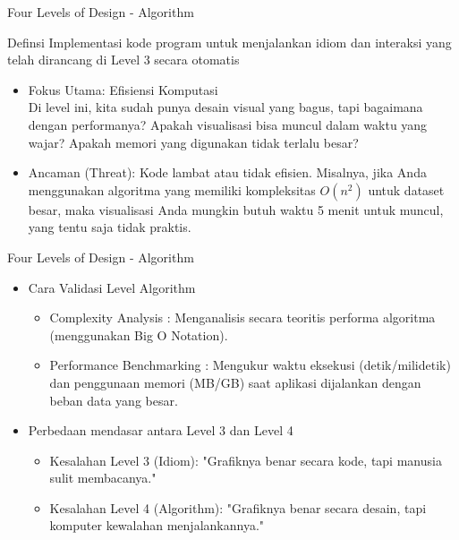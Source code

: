 \documentclass[t]{beamer}
\begin{document}
\begin{frame}{Four Levels of Design - Algorithm}
	\begin{block}{Definsi}
		Implementasi kode program untuk menjalankan idiom dan interaksi yang telah dirancang di Level 3 secara otomatis
	\end{block}
	\begin{itemize}
		\item Fokus Utama: Efisiensi Komputasi \\
		Di level ini, kita sudah punya desain visual yang bagus, tapi bagaimana dengan performanya? Apakah visualisasi bisa muncul dalam waktu yang wajar? Apakah memori yang digunakan tidak terlalu besar?

		\item Ancaman (Threat): Kode lambat atau tidak efisien. Misalnya, jika Anda menggunakan algoritma yang memiliki kompleksitas $O(n^2)$ untuk dataset besar, maka visualisasi Anda mungkin butuh waktu 5 menit untuk muncul, yang tentu saja tidak praktis.
	\end{itemize}
\end{frame}


\begin{frame}{Four Levels of Design - Algorithm}
	\begin{itemize}
		\item Cara Validasi Level Algorithm
		\begin{itemize}
			\item Complexity Analysis : Menganalisis secara teoritis performa algoritma (menggunakan Big O Notation).
			\item Performance Benchmarking : Mengukur waktu eksekusi (detik/milidetik) dan penggunaan memori (MB/GB) saat aplikasi dijalankan dengan beban data yang besar.
		\end{itemize}
		\item Perbedaan mendasar antara Level 3 dan Level 4
		\begin{itemize}
			\item Kesalahan Level 3 (Idiom): "Grafiknya benar secara kode, tapi manusia sulit membacanya."
			\item Kesalahan Level 4 (Algorithm): "Grafiknya benar secara desain, tapi komputer kewalahan menjalankannya."
		\end{itemize}
	\end{itemize}
\end{frame}
\end{document}

